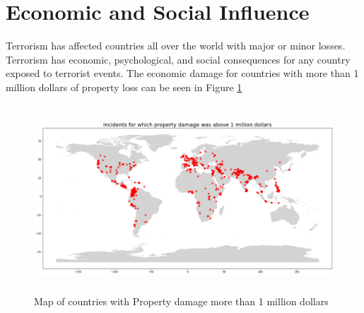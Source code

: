 \documentclass{article}
\begin{document}
\section{Economic and Social Influence}
Terrorism has affected countries all over the world with major or minor losses. Terrorism has economic, psychological, and social consequences for any country exposed to terrorist events. The economic damage for countries with more than 1 million dollars of property loss can be seen in Figure \ref{fig:figure3}

\begin{figure} [h]
\includegraphics[height=7cm]{img/attackdamage.png} 
\caption{Map of countries with Property damage more than 1 million dollars}
\label{fig:figure3}
\end{figure}
\end{document}
